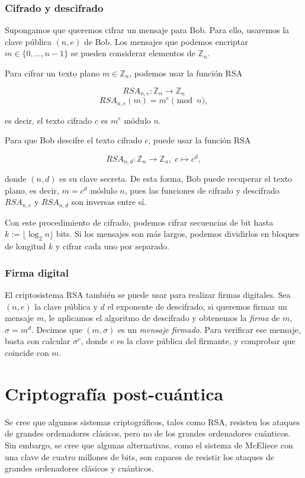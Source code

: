 \subsubsection{Cifrado y descifrado}

Supongamos que queremos cifrar un mensaje para Bob. Para ello, usaremos la clave pública $(n, e)$ de Bob. Los mensajes que podemos encriptar $m \in \{ 0, ..., n-1 \}$ se pueden considerar elementos de $\mathbb{Z}_n$.

Para cifrar un texto plano $m \in \mathbb{Z}_n$, podemos usar la función RSA

$$RSA_{n, e} : \mathbb{Z}_n \longrightarrow \mathbb{Z}_n$$
$$ RSA_{n, e}(m) = m^e \pmod{n},$$

es decir, el texto cifrado $c$ es $m^e$ módulo $n$.

Para que Bob descifre el texto cifrado $c$, puede usar la función RSA

$$RSA_{n, d} : \mathbb{Z}_n \longrightarrow \mathbb{Z}_n, \; c \longmapsto c^d,$$

donde $(n, d)$ es su clave secreta. De esta forma, Bob puede recuperar el texto plano, es decir, $m = c^d$ módulo $n$, pues las funciones de cifrado y descifrado $RSA_{n, e}$ y $RSA_{n, d}$ son inversas entre sí.

Con este procedimiento de cifrado, podemos cifrar secuencias de bit hasta $k := \lfloor \log_2{n} \rfloor$ bits. Si los mensajes son más largos, podemos dividirlos en bloques de longitud $k$ y cifrar cada uno por separado.

\subsubsection{Firma digital}

El criptosistema RSA también se puede usar para realizar firmas digitales. Sea $(n, e)$ la clave pública y $d$ el exponente de descifrado, si queremos firmar un mensaje $m$, le aplicamos el algoritmo de descifrado y obtenemos la \emph{firma} de $m$, $\sigma = m^d$. Decimos que $(m, \sigma)$ es un \emph{mensaje firmado}. Para verificar ese mensaje, basta con calcular $\sigma ^e$, donde $e$ es la clave pública del firmante, y comprobar que coincide con $m$.

\section{Criptografía post-cuántica}

Se cree que algumos sistemas criptográficos, tales como RSA, resisten los ataques de grandes ordenadores clásicos, pero no de los grandes ordenadores cuánticos. Sin embargo, se cree que algunas alternativas, como el sistema de McEliece con una clave de cuatro millones de bits, son capaces de resistir los ataques de grandes ordenadores clásicos y cuánticos.

